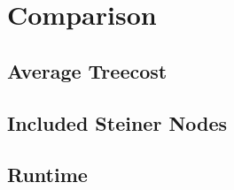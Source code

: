 
\chapter{Comparison}\label{chapter:05_comparison}

\section{Average Treecost}
\section{Included Steiner Nodes}
\section{Runtime}